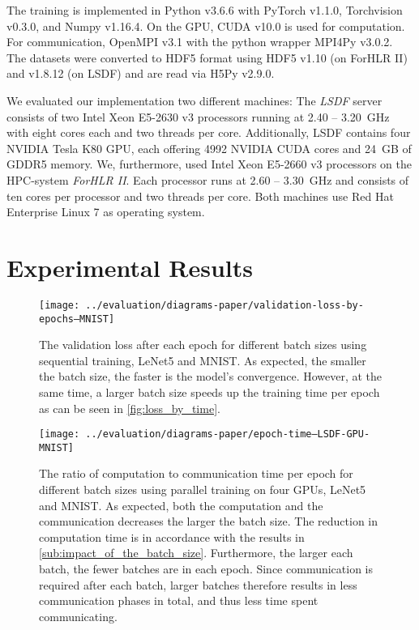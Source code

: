 \documentclass[conference,compsoc,a4paper]{IEEEtran}
\begin{document}
The training is implemented in Python v3.6.6 with PyTorch v1.1.0, Torchvision v0.3.0, and Numpy v1.16.4.
On the GPU, CUDA v10.0 is used for computation.
For communication, OpenMPI v3.1 with the python wrapper MPI4Py v3.0.2.
The datasets were converted to HDF5 format using HDF5 v1.10 (on ForHLR II) and v1.8.12 (on LSDF) and are read via H5Py v2.9.0.

We evaluated our implementation two different machines:
The \emph{LSDF} server consists of two Intel Xeon E5-2630 v3 processors running at 2.40 – 3.20~GHz with eight cores each and two threads per core.
Additionally, LSDF contains four NVIDIA Tesla K80 GPU, each offering 4992 NVIDIA CUDA cores and 24~GB of GDDR5 memory.
%
We, furthermore, used Intel Xeon E5-2660 v3 processors on the HPC-system \emph{ForHLR II}. %
Each processor runs at 2.60 – 3.30~GHz and consists of ten cores per processor and two threads per core.
%
Both machines use Red Hat Enterprise Linux 7 as operating system.



\section{Experimental Results} %
\label{sec:experimental_results}

\begin{figure}[h]
\centering
\texttt{[image: ../evaluation/diagrams-paper/validation-loss-by-epochs--MNIST]}
\caption{The validation loss after each epoch for different batch sizes using sequential training, LeNet5 and MNIST.
As expected, the smaller the batch size, the faster is the model's convergence.
However, at the same time, a larger batch size speeds up the training time per epoch as can be seen in \autoref{fig:loss_by_time}.}
\label{fig:loss_by_epoch}
\end{figure}

\begin{figure}[h]
\centering
\texttt{[image: ../evaluation/diagrams-paper/epoch-time--LSDF-GPU-MNIST]}
\caption{The ratio of computation to communication time per epoch for different batch sizes using parallel training on four GPUs, LeNet5 and MNIST.
As expected, both the computation and the communication decreases the larger the batch size.
The reduction in computation time is in accordance with the results in \autoref{sub:impact_of_the_batch_size}.
Furthermore, the larger each batch, the fewer batches are in each epoch.
Since communication is required after each batch, larger batches therefore results in less communication phases in total, and thus less time spent communicating.}
\label{fig:comm_time_by_batch_size}
\end{figure}
\end{document}
